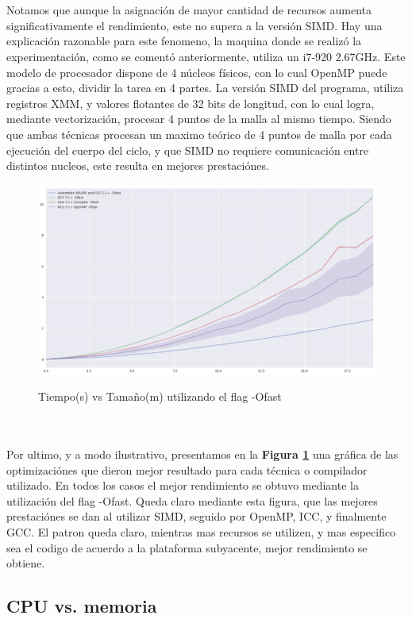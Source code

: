 ~\\
~\\
Notamos que aunque la asignación de mayor cantidad de recursos aumenta significativamente el rendimiento, este no supera a la versión SIMD. Hay una explicación razonable para este fenomeno, la maquina donde se realizó la experimentación, como se comentó anteriormente, utiliza un i7-920 2.67GHz. Este modelo de procesador dispone de 4 núcleos físicos, con lo cual OpenMP puede gracias a esto, dividir la tarea en 4 partes. La versión SIMD del programa, utiliza registros XMM, y valores flotantes de 32 bits de longitud, con lo cual logra, mediante vectorización, procesar 4 puntos de la malla al mismo tiempo. Siendo que ambas técnicas procesan un maximo teórico de 4 puntos de malla por cada ejecución del cuerpo del ciclo, y que SIMD no requiere comunicación entre distintos nucleos, este resulta en mejores prestaciónes.

\begin{figure}[!htbp]
\caption{Tiempo(s) vs Tamaño(m) utilizando el flag -Ofast}
\includegraphics[width=\textwidth]{imagenes/plot_ofast.png}
\label{fig:plot_ofast}
\end{figure}
~\\
~\\

Por ultimo, y a modo ilustrativo, presentamos en la \textbf{Figura \ref{fig:plot_ofast}} una gráfica de las optimizaciónes que dieron mejor resultado para cada técnica o compilador utilizado. En todos los casos el mejor rendimiento se obtuvo mediante la utilización del flag -Ofast. Queda claro mediante esta figura, que las mejores prestaciónes se dan al utilizar SIMD, seguido por OpenMP, ICC, y finalmente GCC. El patron queda claro, mientras mas recursos se utilizen, y mas especifico sea el codigo de acuerdo a la plataforma subyacente, mejor rendimiento se obtiene. 


\subsection{CPU vs. memoria}